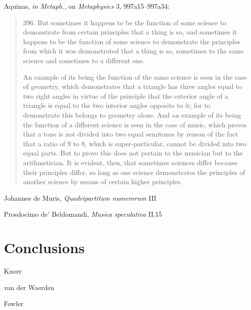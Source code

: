 \documentclass{amsart}
\theoremstyle{definition}
\begin{document}
Aquinas, {\em in Metaph.}, on {\em Metaphysics} 3, 997a15--997a34:

\begin{quote}
396. But sometimes it happens to be the function of some science to demonstrate from certain principles that a thing is so, and sometimes it happens to be the function of some science to demonstrate the principles from which it was demonstrated that a thing is so, sometimes to the same science and sometimes to a different one.

An example of its being the function of the same science is seen in the case of geometry, which demonstrates that a triangle has three angles equal to two right angles in virtue of the principle that the exterior angle of a triangle is equal to the two interior angles opposite to it; for to demonstrate this belongs to geometry alone. And an example of its being the function of a different science is seen in the case of music, which proves that a tone is not divided into two equal semitones by reason of the fact that a ratio of 9 to 8, which is super-particular, cannot be divided into two equal parts. But to prove this does not pertain to the musician but to the arithmetician. It is evident, then, that sometimes sciences differ because their principles differ, so long as one science demonstrates the principles of another science by means of certain higher principles.
\end{quote}

Johannes de Muris, {\em Quadripartitum numerorum} III \cite[p.~270]{huillier}

Prosdocimo de' Beldomandi, {\em Musica speculativa} II.15 \cite[pp.~198]{herlinger}






\section{Conclusions}
Knorr \cite{knorr}

van der Waerden \cite{waerden}

Fowler \cite{fowler}




\end{document}
